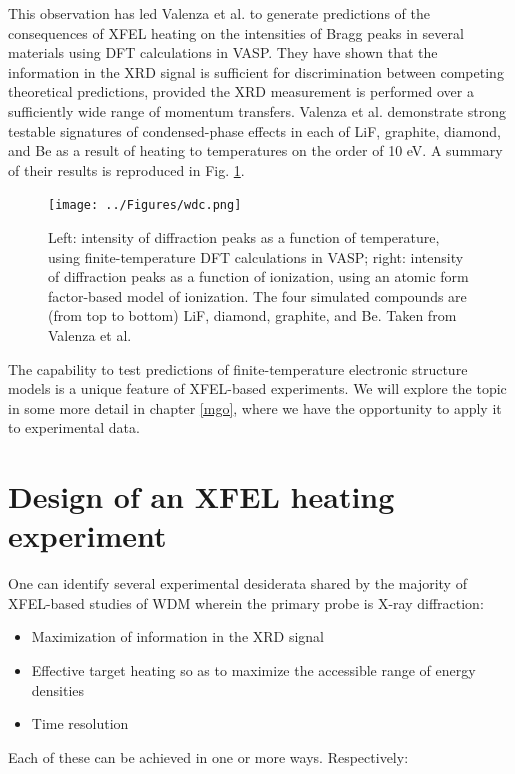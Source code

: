 \documentclass [11pt, proquest, article] {uwthesis}[2016/11/22]
\begin{document}
This observation has led Valenza et al. to generate predictions of the consequences of XFEL heating on the intensities of Bragg peaks in several materials using DFT calculations in VASP.\cite{valenza2016warm} They have shown that the information in the XRD signal is sufficient for discrimination between competing theoretical predictions, provided the XRD measurement is performed over a sufficiently wide range of momentum transfers. Valenza et al. demonstrate strong testable signatures of condensed-phase effects in each of LiF, graphite, diamond, and Be as a result of heating to temperatures on the order of 10 eV. A summary of their results is reproduced in Fig. \ref{fig:wdc}.

\begin{figure}[h] 
\caption{Left: intensity of diffraction peaks as a function of temperature, using finite-temperature DFT calculations in VASP; right: intensity of diffraction peaks as a function of ionization, using an atomic form factor-based model of ionization. The four simulated compounds are (from top to bottom) LiF, diamond, graphite, and Be. Taken from Valenza et al.\cite{valenza2016warm}}
\label{fig:wdc}
\centering
\texttt{[image: ../Figures/wdc.png]}
\end{figure}

The capability to test predictions of finite-temperature electronic structure models is a unique feature of XFEL-based experiments. We will explore the topic in some more detail in chapter \ref{mgo}, where we have the opportunity to apply it to experimental data. 

\section{Design of an XFEL heating experiment}
One can identify several experimental desiderata shared by the majority of XFEL-based studies of WDM wherein the primary probe is X-ray diffraction:

\begin{itemize}
\item{Maximization of information in the XRD signal}
\item{Effective target heating so as to maximize the accessible range of energy densities}
\item{Time resolution}
\end{itemize}

Each of these can be achieved in one or more ways. Respectively:
\end{document}
